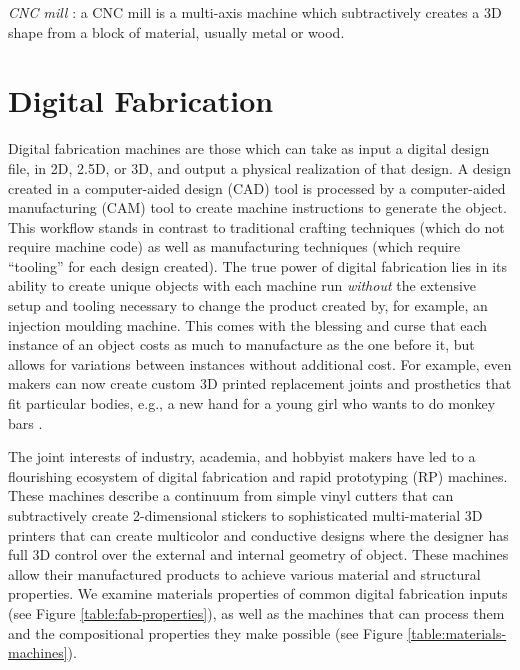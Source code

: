 \emph{CNC mill} : a CNC mill is a multi-axis machine which subtractively creates a 3D shape from a block of material, usually metal or wood.

\section{Digital Fabrication}

Digital fabrication machines are those which can take as input a digital design file, in 2D, 2.5D, or 3D, and output a physical realization of that design. A design created in a computer-aided design (CAD) tool is processed by a computer-aided manufacturing (CAM) tool to create machine instructions to generate the object. This workflow stands in contrast to traditional crafting techniques (which do not require machine code) as well as manufacturing techniques (which require ``tooling'' for each design created). The true power of digital fabrication lies in its ability to create unique objects with each machine run \emph{without} the extensive setup and tooling necessary to change the product created by, for example, an injection moulding machine. This comes with the blessing and curse that each instance of an object costs as much to manufacture as the one before it, but allows for variations between instances without additional cost. For example, even makers can now create custom 3D printed replacement joints and prosthetics that fit particular bodies, e.g., a new hand for a young girl who wants to do monkey bars \cite{myers-sophie}.

The joint interests of industry, academia, and hobbyist makers have led to a flourishing ecosystem of digital fabrication and rapid prototyping (RP) machines. These machines describe a continuum from simple vinyl cutters that can subtractively create 2-dimensional stickers to sophisticated multi-material 3D printers that can create multicolor and conductive designs where the designer has full 3D control over the external and internal geometry of object. These machines allow their manufactured products to achieve various material and structural properties. We examine materials properties of common digital fabrication inputs (see Figure \ref{table:fab-properties}), as well as the machines that can process them and the compositional properties they make possible (see Figure \ref{table:materials-machines}).

